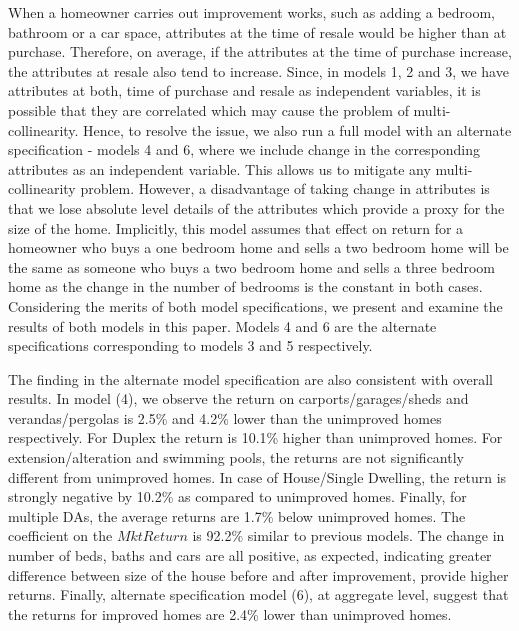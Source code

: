 \documentclass[AEJ,reqno, draftmode]{AEA} %
\begin{document}

When a homeowner carries out improvement works, such as adding a bedroom, bathroom or a car space, attributes at the time of resale would be higher than at purchase. Therefore, on average, if the attributes at the time of purchase increase, the attributes at resale also tend to increase. Since, in models 1, 2 and 3, we have attributes at both, time of purchase and resale as independent variables, it is possible that they are correlated which may cause the problem of multi-collinearity. Hence, to resolve the issue, we also run a full model with an alternate specification - models 4 and 6, where we include change in the corresponding attributes as an independent variable. This allows us to mitigate any multi-collinearity problem. However, a disadvantage of taking change in attributes is that we lose absolute level details of the attributes which provide a proxy for the size of the home. Implicitly, this model assumes that effect on return for a homeowner who buys a one bedroom home and sells a two bedroom home will be the same as someone who buys a two bedroom home and sells a three bedroom home as the change in the number of bedrooms is the constant in both cases. Considering the merits of both model specifications, we present and examine the results of both models in this paper. Models 4 and 6 are the alternate specifications corresponding to models 3 and 5 respectively.

The finding in the alternate model specification are also consistent with overall results. In model (4), we observe the return on carports/garages/sheds and verandas/pergolas is 2.5\% and 4.2\% lower than the unimproved homes respectively. For Duplex the return is 10.1\% higher than unimproved homes. For extension/alteration and swimming pools, the returns are not significantly different from unimproved homes. In case of House/Single Dwelling, the return is strongly negative by 10.2\% as compared to unimproved homes. Finally, for multiple DAs, the average returns are 1.7\% below unimproved homes. The coefficient on the $MktReturn$ is 92.2\% similar to previous models. The change in number of beds, baths and cars are all positive, as expected, indicating greater difference between size of the house before and after improvement, provide higher returns. Finally, alternate specification model (6), at aggregate level, suggest that the returns for improved homes are 2.4\% lower than unimproved homes.
\end{document}
